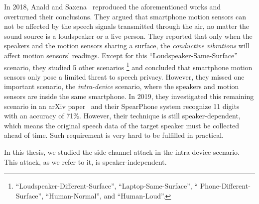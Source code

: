 In 2018, Anald and Saxena~\cite{anand2018speechless} reproduced the aforementioned works and overturned their conclusions. They argued that smartphone motion sensors can not be affected by the speech signals transmitted through the air, no matter the sound source is a loudspeaker or a live person. They reported that only when the speakers and the motion sensors sharing a surface,  the \textit{conductive vibrations} will affect motion sensors' readings. Except for this ``Loudspeaker-Same-Surface'' scenario, they studied 5 other  scenarios
\footnote{\scriptsize``Loudspeaker-Different-Surface'', ``Laptop-Same-Surface'', `` Phone-Different-Surface'', 		``Human-Normal'', and ``Human-Loud''.}  
and concluded that smartphone motion sensors only pose a limited threat to speech privacy.
%
However, they missed one important scenario,  the \textit{intra-device} scenario, where the speakers and motion sensors are inside the same smartphone. In 2019, they investigated this remaining scenario in an arXiv paper~\cite{anand2019spearphone} and their SpearPhone system recognize 11 digits with an accuracy of 71\%.  However, their technique is still speaker-dependent, which means the original speech data of the target speaker must be collected ahead of time. Such requirement is very hard to be fulfilled in practical.

In this thesis, we studied the side-channel attack in the intra-device scenario. This \textit{{\attackName}} attack, as we refer to it, is speaker-independent.





